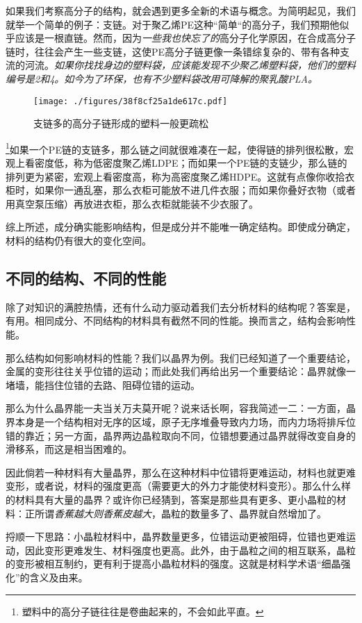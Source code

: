 如果我们考察高分子的结构，就会遇到更多全新的术语与概念。为简明起见，我们就举一个简单的例子：支链。对于聚乙烯PE这种“简单“的高分子，我们预期他似乎应该是一根直链。然而，因为\textsl{一些我也快忘了的}高分子化学原因，在合成高分子链时，往往会产生一些支链，这使PE高分子链更像一条错综复杂的、带有各种支流的河流。\textsl{如果你找找身边的塑料袋，应该能发现不少聚乙烯塑料袋，他们的塑料编号是2和4。如今为了环保，也有不少塑料袋改用可降解的聚乳酸PLA。}
\begin{figure}[ht]
\centering
\texttt{[image: ./figures/38f8cf25a1de617c.pdf]}
\caption{支链多的高分子链形成的塑料一般更疏松} \label{fig_MSEINT_4}
\end{figure}
\footnote{塑料中的高分子链往往是卷曲起来的，不会如此平直。}如果一个PE链的支链多，那么链之间就很难凑在一起，使得链的排列很松散，宏观上看密度低，称为低密度聚乙烯LDPE；而如果一个PE链的支链少，那么链的排列更为紧密，宏观上看密度高，称为高密度聚乙烯HDPE。这就有点像你收拾衣柜时，如果你一通乱塞，那么衣柜可能放不进几件衣服；而如果你叠好衣物（或者用真空泵压缩）再放进衣柜，那么衣柜就能装不少衣服了。

综上所述，成分确实能影响结构，但是成分并不能唯一确定结构。即使成分确定，材料的结构仍有很大的变化空间。
 
\subsection{不同的结构、不同的性能}

除了对知识的满腔热情，还有什么动力驱动着我们去分析材料的结构呢？答案是，有用。相同成分、不同结构的材料具有截然不同的性能。换而言之，结构会影响性能。

那么结构如何影响材料的性能？我们以晶界为例。我们已经知道了一个重要结论，金属的变形往往关乎位错的运动；而此处我们再给出另一个重要结论：晶界就像一堵墙，能挡住位错的去路、阻碍位错的运动。

那么为什么晶界能一夫当关万夫莫开呢？说来话长啊，容我简述一二：一方面，晶界本身是一个结构相对无序的区域，原子无序堆叠导致内力场，而内力场将排斥位错的靠近；另一方面，晶界两边晶粒取向不同，位错想要通过晶界就得改变自身的滑移系，而这是相当困难的。

因此倘若一种材料有大量晶界，那么在这种材料中位错将更难运动，材料也就更难变形，或者说，材料的强度更高（需要更大的外力才能使材料变形）。那么什么样的材料具有大量的晶界？或许你已经猜到，答案是那些具有更多、更小晶粒的材料：正所谓\textsl{香蕉越大则香蕉皮越大}，晶粒的数量多了、晶界就自然增加了。

捋顺一下思路：小晶粒材料中，晶界数量更多，位错运动更被阻碍，位错也更难运动，因此变形更难发生、材料强度也更高。此外，由于晶粒之间的相互联系，晶粒的变形被相互制约，更有利于提高小晶粒材料的强度。这就是材料学术语“细晶强化”的含义及由来。

